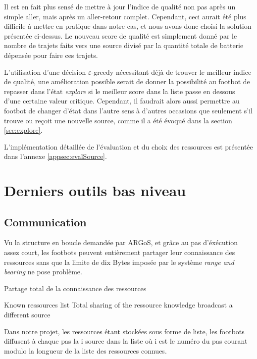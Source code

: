 Il est en fait plus sensé de mettre à jour l'indice de qualité non pas après un simple aller, mais après un aller-retour complet. Cependant, ceci aurait été plus difficile à mettre en pratique dans notre cas, et nous avons donc choisi la solution présentée ci-dessus. Le nouveau score de qualité est simplement donné par le nombre de trajets faits vers une source divisé par la quantité totale de batterie dépensée pour faire ces trajets.

L'utilisation d'une décision $\varepsilon$-greedy nécessitant déjà de trouver le meilleur indice de qualité, une amélioration possible serait de donner la possibilité au footbot de repasser dans l'état \emph{explore} si le meilleur score dans la liste passe en dessous d'une certaine valeur critique. Cependant, il faudrait alors aussi permettre au footbot de changer d'état dans l'autre sens à d'autres occasions que seulement s'il trouve ou reçoit une nouvelle source, comme il a été évoqué dans la section \ref{sec:explore}.

L'implémentation détaillée de l'évaluation et du choix des ressources est présentée dans l'annexe \ref{appsec:evalSource}.

\section{Derniers outils bas niveau}

\subsection{Communication\label{sec:commu}}

Vu la structure en boucle demandée par ARGoS, et grâce au pas d'éxécution assez court, les footbots peuvent entièrement partager leur connaissance des ressources sans que la limite de dix Bytes imposée par le système \emph{range and bearing} ne pose problème.

\begin{algorithm}
  \caption{Partage total de la connaissance des ressources}
  \begin{algorithmic}
  \REQUIRE Known ressources list
  \ENSURE Total sharing of the ressource knowledge
  \LOOP
  \STATE broadcast a different source
  \ENDLOOP
  \end{algorithmic}
\end{algorithm}

Dans notre projet, les ressources étant stockées sous forme de liste, les footbots diffusent à chaque pas la i\ieme{} source dans la liste où i est le numéro du pas courant modulo la longueur de la liste des ressources connues.

